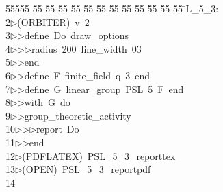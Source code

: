 %
%
\begin{tabbing}
55555 \= 55 \= 55 \= 55 \= 55 \= 55 \= 55 \= 55 \= 55 \= 55 \= 55 \= 55 \= 55 \= \>L\_5\_3:\\[0pt]
2\>$\triangleright$\>(ORBITER)\ v\ 2\ \\[0pt]
3\>$\triangleright$\>$\triangleright$\>define\ Do\ draw\_options\ \\[0pt]
4\>$\triangleright$\>$\triangleright$\>$\triangleright$\>radius\ 200\ line\_width\ 03\ \\[0pt]
5\>$\triangleright$\>$\triangleright$\>end\ \\[0pt]
6\>$\triangleright$\>$\triangleright$\>define\ F\ finite\_field\ q\ 3\ end\ \\[0pt]
7\>$\triangleright$\>$\triangleright$\>define\ G\ linear\_group\ PSL\ 5\ F\ end\ \\[0pt]
8\>$\triangleright$\>$\triangleright$\>with\ G\ do\ \\[0pt]
9\>$\triangleright$\>$\triangleright$\>group\_theoretic\_activity\ \\[0pt]
10\>$\triangleright$\>$\triangleright$\>$\triangleright$\>report\ Do\ \\[0pt]
11\>$\triangleright$\>$\triangleright$\>end\\[0pt]
12\>$\triangleright$\>(PDFLATEX)\ PSL\_5\_3\_reporttex\\[0pt]
13\>$\triangleright$\>(OPEN)\ PSL\_5\_3\_reportpdf\\[0pt]
14\>\end{tabbing}
